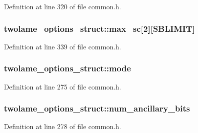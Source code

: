 Definition at line 320 of file common.\+h.

\subsubsection[{\texorpdfstring{max\+\_\+sc}{max_sc}}]{ twolame\+\_\+options\+\_\+struct\+::max\+\_\+sc\mbox{[}2\mbox{]}\mbox{[}{\bf S\+B\+L\+I\+M\+IT}\mbox{]}}\hypertarget{structtwolame__options__struct_ac903ebf73ade75184ba1cdaa9e088edc}{}\label{structtwolame__options__struct_ac903ebf73ade75184ba1cdaa9e088edc}


Definition at line 339 of file common.\+h.

\subsubsection[{\texorpdfstring{mode}{mode}}]{ twolame\+\_\+options\+\_\+struct\+::mode}\hypertarget{structtwolame__options__struct_a9a485b580a62dd91ca9d2b6c51cbddb5}{}\label{structtwolame__options__struct_a9a485b580a62dd91ca9d2b6c51cbddb5}


Definition at line 275 of file common.\+h.

\subsubsection[{\texorpdfstring{num\+\_\+ancillary\+\_\+bits}{num_ancillary_bits}}]{ twolame\+\_\+options\+\_\+struct\+::num\+\_\+ancillary\+\_\+bits}\hypertarget{structtwolame__options__struct_ae5124ecbd090fd5ff6aae6900a7b6ed4}{}\label{structtwolame__options__struct_ae5124ecbd090fd5ff6aae6900a7b6ed4}


Definition at line 278 of file common.\+h.

